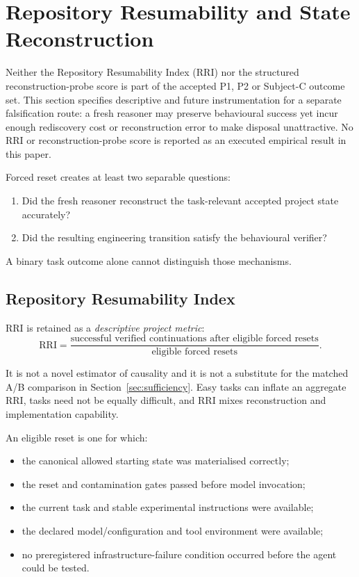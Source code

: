 \section{Repository Resumability and State Reconstruction}
\label{sec:resumability}

Neither the Repository Resumability Index (RRI) nor the structured reconstruction-probe score is part of the accepted P1, P2 or Subject-C outcome set. This section specifies descriptive and future instrumentation for a separate falsification route: a fresh reasoner may preserve behavioural success yet incur enough rediscovery cost or reconstruction error to make disposal unattractive. No RRI or reconstruction-probe score is reported as an executed empirical result in this paper.

Forced reset creates at least two separable questions:

\begin{enumerate}
    \item Did the fresh reasoner reconstruct the task-relevant accepted project state accurately?
    \item Did the resulting engineering transition satisfy the behavioural verifier?
\end{enumerate}

A binary task outcome alone cannot distinguish those mechanisms.

\subsection{Repository Resumability Index}

RRI is retained as a \emph{descriptive project metric}:
\begin{equation}
\mathrm{RRI}
=
\frac{\text{successful verified continuations after eligible forced resets}}
{\text{eligible forced resets}}.
\label{eq:rri}
\end{equation}

It is not a novel estimator of causality and it is not a substitute for the matched A/B comparison in Section~\ref{sec:sufficiency}. Easy tasks can inflate an aggregate RRI, tasks need not be equally difficult, and RRI mixes reconstruction and implementation capability.

An eligible reset is one for which:
\begin{itemize}
    \item the canonical allowed starting state was materialised correctly;
    \item the reset and contamination gates passed before model invocation;
    \item the current task and stable experimental instructions were available;
    \item the declared model/configuration and tool environment were available;
    \item no preregistered infrastructure-failure condition occurred before the agent could be tested.
\end{itemize}

